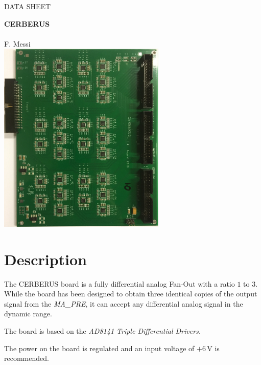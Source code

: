 \documentclass[fyslu,english]{report}
\begin{document}
\begin{center} 
{\Large DATA SHEET} \vspace{0.5cm}

\vspace{3cm}
{\Huge \textbf{ CERBERUS } }
\\ \vspace{1cm}{\Large (1 to 3 analog fully differential Fan-Out)}
\\ \vspace{1cm} {F. Messi}
\\ \vspace{1.5cm}
{\includegraphics[width=0.6\textwidth]{IMG_9270}}
\end{center} 


\newpage
\section{Description}
The CERBERUS board is a fully differential analog Fan-Out with a ratio $1$ to $3$. 
While the board has been designed to obtain three identical copies of the output signal from the \emph{MA\_PRE}, it can accept any differential analog signal in the dynamic range. 

The board is based on the \emph{AD8141 Triple Differential Drivers.}  

The power on the board is regulated and an input voltage of $+6\,\si\V$ is recommended. \\
\end{document}
